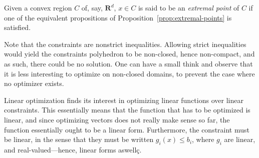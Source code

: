 \begin{definition}
    Given a convex region $ C $ of, say, $ \mathbf R^d $, $ x \in C $ is said to be an \textit{extremal point} of $ C $ if one of the equivalent propositions of Proposition~\ref{prop:extremal-points} is satisfied.
\end{definition}

\begin{remark}
    Note that the constraints are nonstrict inequalities. Allowing strict inequalities would yield the constraints polyhedron to be non-closed, hence non-compact, and as such, there could be no solution. One can have a small think and observe that it is less interesting to optimize on non-closed domains, to prevent the case where no optimizer exists.
\end{remark}

\begin{remark}
    Linear optimization finds its interest in optimizing linear functions over linear constraints. This essentially means that the function that has to be optimized is linear, and since optimizing vectors does not really make sense so far, the function essentially ought to be a linear form. Furthermore, the constraint must be linear, in the sense that they must be written $ g_i(x) \leqslant b_i $, where $ g_i $ are linear, and real-valued---hence, linear forms aswellç.
\end{remark}

